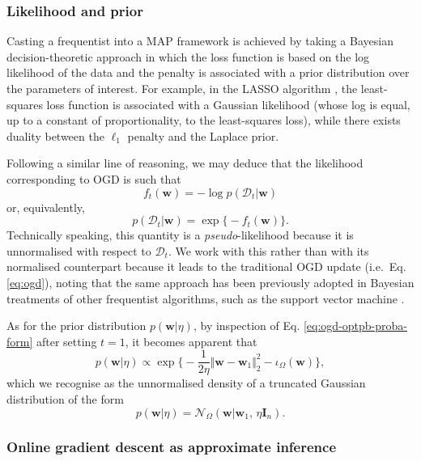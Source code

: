 \subsubsection{Likelihood and prior}

Casting a frequentist into a MAP framework is achieved by taking a Bayesian decision-theoretic approach in which the loss function is based on the log likelihood of the data and the penalty is associated with a prior distribution over the parameters of interest. For example, in the LASSO algorithm \citep{tibshirani96}, the least-squares loss function is associated with a Gaussian likelihood (whose log is equal, up to a constant of proportionality, to the least-squares loss), while there exists duality between the $\ell_1$ penalty and the Laplace prior.

Following a similar line of reasoning, we may deduce that the likelihood corresponding to OGD is such that
\begin{equation}
	f_t(\mathbf{w}) = -\log p(\mathcal{D}_t|\mathbf{w})
\end{equation}
or, equivalently,
\begin{equation}
\label{eq:ogd-pseudo-likelihood}
	p(\mathcal{D}_t|\mathbf{w})
	= \exp\Big\{-f_t(\mathbf{w})\Big\}.
\end{equation}
Technically speaking, this quantity is a \emph{pseudo}-likelihood because it is unnormalised with respect to $\mathcal{D}_t$. We work with this rather than with its normalised counterpart because it leads to the traditional OGD update (i.e.\ Eq. \eqref{eq:ogd}), noting that the same approach has been previously adopted in Bayesian treatments of other frequentist algorithms, such as the support vector machine \citep{polson&scott, henao14}.

As for the prior distribution $p(\mathbf{w}|\eta)$, by inspection of Eq. \eqref{eq:ogd-optpb-proba-form} after setting $t = 1$, it becomes apparent that
\begin{equation}
	p(\mathbf{w}|\eta)
	\propto \exp\Big\{-\frac{1}{2\eta}\Vert\mathbf{w}-\mathbf{w}_1\Vert_2^2 - \iota_{\Omega}(\mathbf{w})\Big\},
\end{equation}
which we recognise as the unnormalised density of a truncated Gaussian distribution of the form
\begin{equation}
\label{eq:ogd-prior}
	p(\mathbf{w}|\eta)
	= \mathcal{N}_{\Omega}(\mathbf{w}|\mathbf{w}_1,\, \eta\mathbf{I}_n).
\end{equation}

\subsubsection{Online gradient descent as approximate inference}

